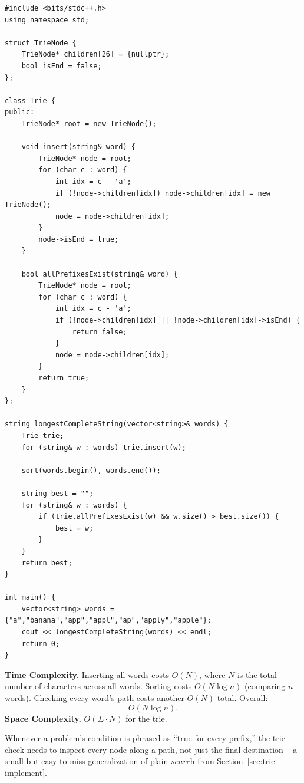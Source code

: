 \begin{lstlisting}
#include <bits/stdc++.h>
using namespace std;

struct TrieNode {
    TrieNode* children[26] = {nullptr};
    bool isEnd = false;
};

class Trie {
public:
    TrieNode* root = new TrieNode();

    void insert(string& word) {
        TrieNode* node = root;
        for (char c : word) {
            int idx = c - 'a';
            if (!node->children[idx]) node->children[idx] = new TrieNode();
            node = node->children[idx];
        }
        node->isEnd = true;
    }

    bool allPrefixesExist(string& word) {
        TrieNode* node = root;
        for (char c : word) {
            int idx = c - 'a';
            if (!node->children[idx] || !node->children[idx]->isEnd) {
                return false;
            }
            node = node->children[idx];
        }
        return true;
    }
};

string longestCompleteString(vector<string>& words) {
    Trie trie;
    for (string& w : words) trie.insert(w);

    sort(words.begin(), words.end());

    string best = "";
    for (string& w : words) {
        if (trie.allPrefixesExist(w) && w.size() > best.size()) {
            best = w;
        }
    }
    return best;
}

int main() {
    vector<string> words = {"a","banana","app","appl","ap","apply","apple"};
    cout << longestCompleteString(words) << endl;
    return 0;
}
\end{lstlisting}

\begin{complexitybox}
\textbf{Time Complexity.} Inserting all words costs $O(N)$, where $N$ is
the total number of characters across all words. Sorting costs
$O(N \log n)$ (comparing $n$ words). Checking every word's path costs
another $O(N)$ total. Overall:
\[
  O(N \log n).
\]
\textbf{Space Complexity.} $O(\Sigma \cdot N)$ for the trie.
\end{complexitybox}

\begin{takeawaybox}
Whenever a problem's condition is phrased as ``true for every prefix,''
the trie check needs to inspect every node along a path, not just the
final destination -- a small but easy-to-miss generalization of plain
$\textit{search}$ from Section~\ref{sec:trie-implement}.
\end{takeawaybox}
